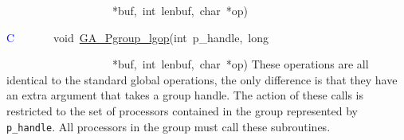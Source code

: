 ~~~~~~~~~~~~~~~~~~~{*}buf,~int~lenbuf,~char~{*}op)

\textcolor{blue}{C}~~~~~~~void~\href{http://www.emsl.pnl.gov/docs/global/c_nga_ops.html\#GA_PGROUP_LGOP}{GA\_{}Pgroup\_{}lgop}(int~p\_handle,~long~

~~~~~~~~~~~~~~~~~~~{*}buf,~int~lenbuf,~char~{*}op)
These operations are all identical to the standard global operations,
the only difference is that they have an extra argument that takes
a group handle. The action of these calls is restricted to the set
of processors contained in the group represented by \texttt{p\_handle}.
All processors in the group must call these subroutines.
